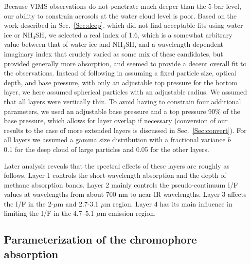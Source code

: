 \documentclass[article,11pt]{emulateapj}
\def\mum{$\mu$m }
\def\nhfshx{NH$_4$SH}
\begin{document}
Because VIMS observations do not penetrate much deeper than the 5-bar
level, our ability to constrain aerosols at the water cloud level is
poor.  Based on the work described in Sec.\ \ref{Sec:deep}, which did
not find acceptable fits using water ice or \nhfshx, we selected a
real index of 1.6, which is a somewhat arbitrary value between that of
water ice and \nhfshx, and a wavelength dependent imaginary index that
crudely varied as some mix of these candidates, but provided generally
more absorption, and seemed to provide a decent overall fit to the
observations. Instead of following \cite{Sro2020spole} in assuming a
fixed particle size, optical depth, and base pressure, with only an
adjustable top pressure for the bottom layer, we here assumed
spherical particles with an adjustable radius.  We assumed that all
layers were vertically thin.  To avoid having to constrain four
additional parameters, we used an adjustable base pressure and a top
pressure 90\% of the base pressure, which allows for layer overlap if
necessary (conversion of our results to the case of more extended
layers is discussed in Sec.\ \ref{Sec:convert}).  For all layers we
assumed a gamma size distribution \citep{Hansen1974} with a fractional
variance $b$ = 0.1 for the deep cloud of large particles and 0.05 for
the other layers.  
  
Later analysis reveals that the spectral effects of
these layers are roughly as follows.  Layer 1 controls the
short-wavelength absorption and  the depth of methane
absorption bands. Layer 2 mainly controls the pseudo-continuum I/F
values at wavelengths from about 700 nm to near-IR wavelengths. Layer
3 affects the I/F in the 2-\mum and 2.7-3.1 \mum region.  Layer 4 has
its main influence in limiting the I/F in the 4.7--5.1 \mum emission
region.

\subsection{Parameterization of the chromophore absorption}\label{Sec:chrompar}
\end{document}
